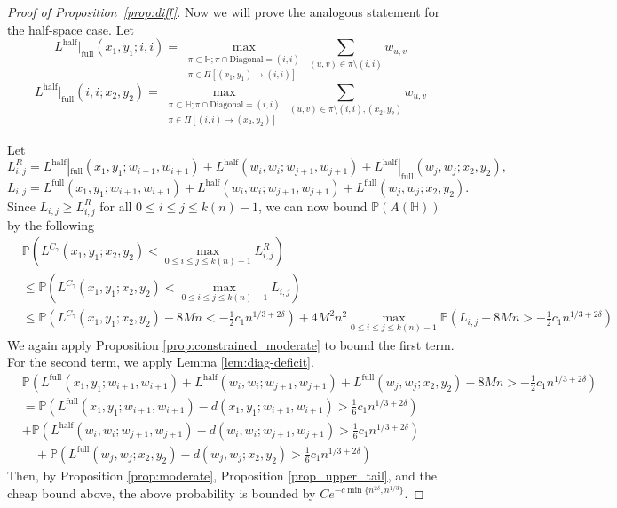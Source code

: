 \documentclass[11pt]{article}
\theoremstyle{definition}
\newcommand{\HH}{\mathbb{H}}
\newcommand{\Prob}{\mathbb{P}}
\newcommand{\Lfull}{L^{\mathrm{full}}}
\newcommand{\Lhalf}{L^{\mathrm{half}}}
\begin{document}
\begin{proof}[Proof of Proposition~\ref{prop:diff}]
Now we will prove the analogous statement for the half-space case. Let 
\[
\Lhalf|_{\text{full}}(x_1,y_1;i,i) = \max_{\substack{ \pi \subset \HH; \pi \cap \text{Diagonal} = (i,i)\\\pi \in \Pi[(x_1,y_1)\to(i,i)]}} \sum_{(u,v)\in\pi \setminus (i,i)} w_{u,v}
\]
\[
\Lhalf|_{\text{full}}(i,i;x_2,y_2) = \max_{\substack{ \pi \subset \HH; \pi \cap \text{Diagonal} = (i,i)\\\pi \in \Pi[(i,i)\to(x_2,y_2)]}} \sum_{(u,v)\in\pi \setminus (i,i),(x_2,y_2)} w_{u,v}
\]

Let
\[
L^R_{i,j} = \Lhalf|_{\text{full}}(x_1,y_1; w_{i+1},w_{i+1}) + \Lhalf(w_i,w_i;w_{j+1},w_{j+1}) + \Lhalf|_{\text{full}}(w_j,w_j;x_2,y_2),
\]
\[
L_{i,j} = \Lfull(x_1,y_1; w_{i+1},w_{i+1}) + \Lhalf(w_i,w_i;w_{j+1},w_{j+1}) + \Lfull(w_j,w_j;x_2,y_2).
\]
Since $L_{i,j} \geq L^R_{i,j}$ for all $0 \leq i\leq j \leq k(n)-1$, we can now bound $\Prob(A(\HH))$ by the following 
\begin{equation}
    \begin{aligned}
        &\Prob\left(L^{C_\gamma}(x_1,y_1; x_2,y_2) < \max_{0 \leq i \leq  j \leq k(n)-1} L^R_{i,j} \right)\\
        &\leq \Prob\left(L^{C_\gamma}(x_1,y_1; x_2,y_2) < \max_{0 \leq i \leq j \leq k(n)-1} L_{i,j}\right)\\
         &\leq \Prob\left(L^{C_\gamma}(x_1,y_1; x_2,y_2) - 8Mn < -\frac{1}{2}c_1 n^{1/3+2\delta} \right) +  4M^2n^2 \max_{0 \leq i \leq  j \leq k(n)-1}\Prob\left( L_{i,j} -8Mn > -\frac{1}{2}c_1 n^{1/3+2\delta} \right)
    \end{aligned}
\end{equation}
We again apply Proposition \ref{prop:constrained_moderate} to bound the first term. For the second term, we apply Lemma \ref{lem:diag-deficit}.
\begin{equation}
    \begin{aligned}
        &\Prob\left(\Lfull(x_1,y_1; w_{i+1},w_{i+1}) + \Lhalf(w_i,w_i;w_{j+1},w_{j+1}) + \Lfull(w_j,w_j;x_2,y_2) -8Mn > -\frac{1}{2}c_1 n^{1/3+2\delta} \right) \\
        &= \Prob\left(\Lfull(x_1,y_1; w_{i+1},w_{i+1}) - d(x_1,y_1;w_{i+1},w_{i+1}) > \frac{1}{6}c_1 n^{1/3+2\delta} \right) \\
        &+\Prob\left(\Lhalf(w_i,w_i;w_{j+1},w_{j+1}) - d(w_i,w_i;w_{j+1},w_{j+1}) > \frac{1}{6}c_1 n^{1/3+2\delta} \right) \\
        &\quad +\Prob\left(\Lfull(w_j,w_j;x_2,y_2) - d(w_j,w_j;x_2,y_2) > \frac{1}{6}c_1 n^{1/3+2\delta} \right)
    \end{aligned}
\end{equation}
Then, by Proposition \ref{prop:moderate}, Proposition \ref{prop_upper_tail}, and the cheap bound above, the above probability is bounded by $Ce^{-c {\min \{n^{2\delta}, n^{1/3} \}}}$.
\end{proof}
\end{document}
